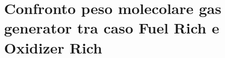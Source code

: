 \section{Confronto peso molecolare gas generator tra caso Fuel Rich e Oxidizer Rich}
\label{appendix:confronto peso molecolare}


